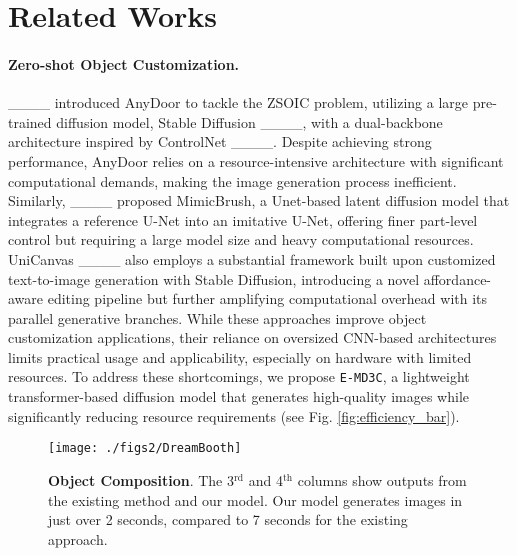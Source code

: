 \section{Related Works}
\label{related_sec}
\paragraph{Zero-shot Object Customization.}
____ introduced AnyDoor to tackle the ZSOIC problem, utilizing a large pre-trained diffusion model, Stable Diffusion ____, with a dual-backbone architecture inspired by ControlNet ____. Despite achieving strong performance, AnyDoor relies on a resource-intensive architecture with significant computational demands, making the image generation process inefficient. Similarly, ____ proposed MimicBrush, a Unet-based latent diffusion model that integrates a reference U-Net into an imitative U-Net, offering finer part-level control but requiring a large model size and heavy computational resources. UniCanvas ____ also employs a substantial framework built upon customized text-to-image generation with Stable Diffusion, introducing a novel affordance-aware editing pipeline but further amplifying computational overhead with its parallel generative branches. While these approaches improve object customization applications, their reliance on oversized CNN-based architectures limits practical usage and applicability, especially on hardware with limited resources. To address these shortcomings, we propose \texttt{E-MD3C}, a lightweight transformer-based diffusion model that generates high-quality images while significantly reducing resource requirements (see Fig. \ref{fig:efficiency_bar}).

\begin{figure}[!htbp]
  \centering
  \texttt{[image: ./figs2/DreamBooth]}
  \vspace{-10pt}
  \caption{\textbf{Object Composition}. The 3$^{\text{rd}}$ and 4$^{\text{th}}$ columns show outputs from the existing method and our model. Our model generates images in just over 2 seconds, compared to 7 seconds for the existing approach.}
  \label{fig:DreamBooth}
\vspace{-14pt}
\end{figure}

